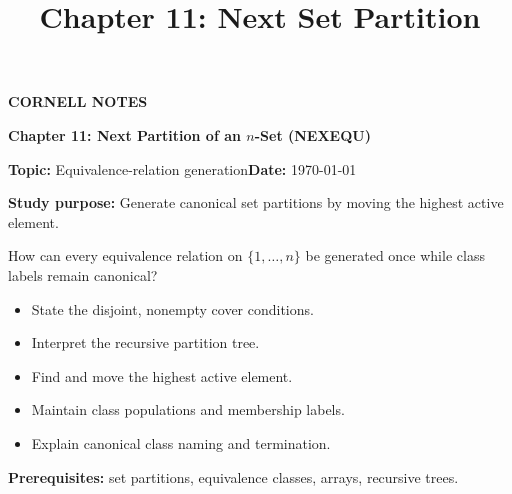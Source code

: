 \documentclass[10pt,letterpaper]{article}
\title{Chapter 11: Next Set Partition}
\author{}
\date{}
\begin{document}
\maketitle
\begin{tcolorbox}[colback=Paper,colframe=Ink]{\small\bfseries\color{Teal}CORNELL NOTES}\par{\LARGE\bfseries Chapter 11: Next Partition of an $n$-Set (NEXEQU)}\par\medskip\textbf{Topic:} Equivalence-relation generation\hfill\textbf{Date:} \today\par\textbf{Study purpose:} Generate canonical set partitions by moving the highest active element.\end{tcolorbox}
\begin{tcolorbox}[colback=Teal!5,colframe=Teal,title=Essential question]How can every equivalence relation on $\{1,\ldots,n\}$ be generated once while class labels remain canonical?\end{tcolorbox}
\begin{tcolorbox}[colback=white,colframe=Mist,title=Learning objectives]\begin{itemize}\item State the disjoint, nonempty cover conditions.\item Interpret the recursive partition tree.\item Find and move the highest active element.\item Maintain class populations and membership labels.\item Explain canonical class naming and termination.\end{itemize}\textbf{Prerequisites:} set partitions, equivalence classes, arrays, recursive trees.\end{tcolorbox}
\end{document}
